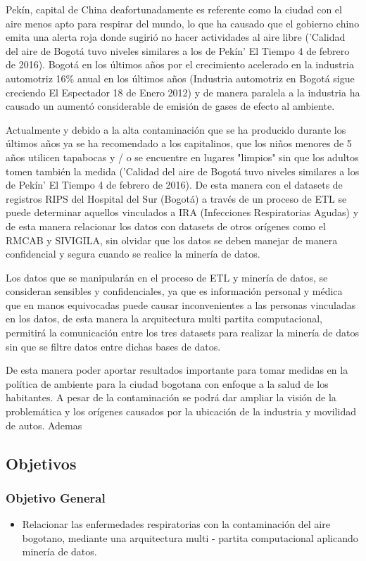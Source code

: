 \documentclass[a4paper, 11pt, oneside]{article}
\theoremstyle{definition}
\theoremstyle{remark}
\begin{document}
Pekín, capital de China deafortunadamente es referente como la ciudad con el aire menos apto para respirar del mundo, lo que ha causado que el gobierno chino emita una alerta roja donde sugirió no hacer actividades al aire libre ('Calidad del aire de Bogotá tuvo niveles similares a los de Pekín' El Tiempo  4 de febrero de 2016). Bogotá en los últimos años por el crecimiento acelerado en la industria automotriz 16\% anual en los últimos años (Industria automotriz en Bogotá sigue creciendo El Espectador 18 de Enero 2012) y de manera paralela a la industria ha causado un aumentó considerable de emisión de gases de efecto al ambiente.

Actualmente y debido a la alta contaminación que se ha producido  durante los últimos años ya se ha recomendado a los capitalinos, que los niños menores de 5 años utilicen tapabocas y / o se encuentre en lugares "limpios" sin que los adultos tomen también la medida ('Calidad del aire de Bogotá tuvo niveles similares a los de Pekín' El Tiempo  4 de febrero de 2016). De esta manera con el datasets de registros RIPS del Hospital del Sur (Bogotá) a través de un proceso de ETL se puede determinar aquellos vinculados a IRA (Infecciones Respiratorias Agudas) y de esta manera relacionar los datos con datasets de otros orígenes como el RMCAB y SIVIGILA, sin olvidar que los datos se deben manejar de manera confidencial y segura cuando se realice la minería de datos.

Los datos que se manipularán en el proceso de ETL y minería de datos, se consideran sensibles y confidenciales, ya que es información personal y médica que en manos equivocadas puede causar inconvenientes a las personas vinculadas en los datos, de esta manera la arquitectura multi partita computacional, permitirá la comunicación entre los tres datasets para realizar la minería de datos sin que se filtre datos entre dichas bases de datos.

De esta manera poder aportar resultados importante para tomar medidas en la política de ambiente para la ciudad bogotana con enfoque a la salud de los habitantes. A pesar de la contaminación se podrá dar ampliar la visión de la problemática y los orígenes causados por la ubicación de la industria y movilidad de autos. Ademas 

\subsection{Objetivos}

\subsubsection{Objetivo General}
\begin{itemize}
\item Relacionar las enfermedades respiratorias con la contaminación del aire bogotano, mediante una arquitectura multi - partita computacional aplicando minería de datos.

\end{itemize}
\end{document}
